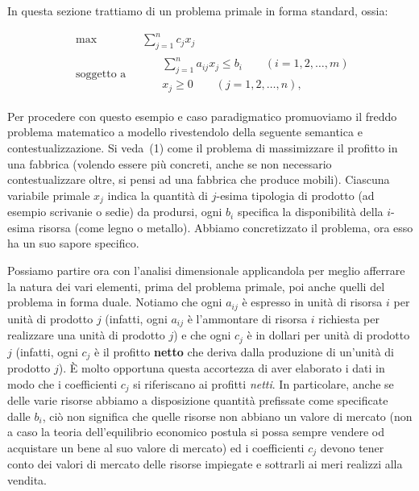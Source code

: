 \documentclass[a4paper,11pt]{article}
\begin{document}
        In questa sezione trattiamo di un problema primale in forma standard,
        ossia:
	
	\begin{equation}\begin{split}
	&\text{max}\qquad\qquad\sum_{j=1}^{n}c_jx_j\\
	&\text{soggetto a} \qquad\begin{split} &\sum_{j=1}^{n}a_{ij}x_j \leq b_i \qquad(i=1,2,\ldots,m)\\
	&x_j\geq0 \qquad(j=1,2,\ldots,n),\end{split}
	\end{split} 
	\end{equation}

        Per procedere con questo esempio e caso paradigmatico
        promuoviamo il freddo problema matematico a modello
        rivestendolo della seguente semantica e contestualizzazione.
        Si veda~(1) come il problema di massimizzare il profitto in una fabbrica (volendo essere pi\`u concreti, anche se non necessario contestualizzare oltre, si pensi ad una fabbrica che produce mobili). Ciascuna variabile primale $x_j$ indica la quantità di $j$-esima tipologia di prodotto (ad esempio scrivanie o sedie) da prodursi, ogni $b_i$ specifica la disponibilità della $i$-esima risorsa (come legno o metallo).
        Abbiamo concretizzato il problema, ora esso ha un suo sapore specifico.
 
        Possiamo partire ora con l'analisi dimensionale applicandola per meglio afferrare la natura dei vari elementi, prima del problema primale, poi anche quelli del problema in forma duale.
	Notiamo che ogni $a_{ij}$ è espresso in unità di risorsa $i$ per unità di prodotto $j$ (infatti, ogni $a_{ij}$ è l'ammontare di risorsa $i$ richiesta per realizzare una unità di prodotto $j$) e che ogni $c_j$ è in dollari per unità di prodotto $j$ (infatti, ogni $c_j$ è il profitto {\bf netto} che deriva dalla produzione di un'unità di prodotto $j$). \`E molto opportuna questa accortezza di aver elaborato i dati in modo che i coefficienti $c_j$ si riferiscano ai profitti \emph{netti}. In particolare, anche se delle varie risorse abbiamo a disposizione quantit\`a prefissate come specificate dalle $b_i$, ci\`o non significa che quelle risorse non abbiano un valore di mercato (non a caso la teoria dell'equilibrio economico postula si possa sempre vendere od acquistare un bene al suo valore di mercato) ed i coefficienti $c_j$ devono tener conto dei valori di mercato delle risorse impiegate e sottrarli ai meri realizzi alla vendita.\\
\end{document}
